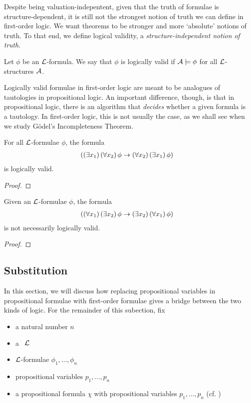 Despite being valuation-indepentent, given that the truth of formulae is structure-dependent, it is still not the strongest notion of truth we can define in first-order logic. We want theorems to be stronger and more `absolute' notions of truth. To that end, we define logical validity, a \textit{structure-independent notion of truth}.

\begin{boxdefinition}
    Let $\phi$ be an $\mathcal{L}$-formula. We say that $\phi$ is logically valid if $\mathcal{A} \models \phi$ for all $\mathcal{L}$-structures $\mathcal{A}$.
\end{boxdefinition}

Logically valid formulae in first-order logic are meant to be analogues of tautologies in propositional logic. An important difference, though, is that in propositional logic, there is an algorithm that \textit{decides} whether a given formula is a tautology. In first-order logic, this is not usually the case, as we shall see when we study Gödel's Incompleteness Theorem.

\begin{boxexample}
    For all $\mathcal{L}$-formulae $\phi$, the formula
    \begin{align*}
        \left( \left( \exists x_1 \right)\left( \forall x_2 \right)\phi \to \left( \forall x_2 \right)\left( \exists x_1 \right)\phi \right)
    \end{align*}
    is logically valid.
    \begin{proof}
        \sorry
    \end{proof}
\end{boxexample}

\begin{boxnexample}
    Given an $\mathcal{L}$-formulae $\phi$, the formula
    \begin{align*}
        \left( \left( \forall x_1 \right)\left( \exists x_2 \right)\phi \to \left( \exists x_2 \right)\left( \forall x_1 \right)\phi \right)
    \end{align*}
    is not necessarily logically valid.
    \begin{proof}
        \sorry
    \end{proof}
\end{boxnexample}

\subsection{Substitution}

In this section, we will discuss how replacing propositional variables in propositional formulae with first-order formulae gives a bridge between the two kinds of logic. For the remainder of this subection, fix
\begin{itemize}
    \item a natural number $n$
    \item a \fola\ $\mathcal{L}$
    \item $\mathcal{L}$-formulae $\phi_1, \ldots, \phi_n$
    \item propositional variables $p_1, \ldots, p_n$
    \item a propositional formula $\chi$ with propositional variables $p_1, \ldots, p_n$ (cf. )
\end{itemize}

